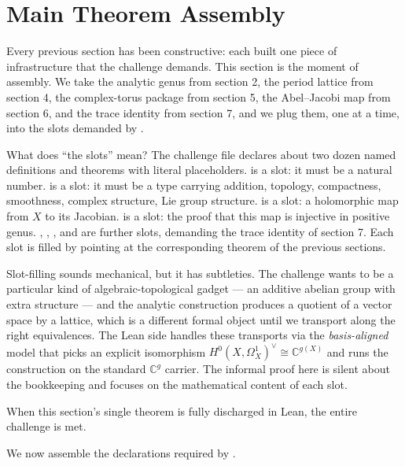 \section{Main Theorem Assembly}
\label{sec:main-assembly}

\begin{layman}
Every previous section has been constructive: each built one piece
of infrastructure that the challenge demands. This section is the
moment of assembly. We take the analytic genus from section 2, the
period lattice from section 4, the complex-torus package from
section 5, the Abel--Jacobi map from section 6, and the trace
identity from section 7, and we plug them, one at a time, into
the slots demanded by .

What does ``the slots'' mean? The challenge file declares about
two dozen named definitions and theorems with literal 
placeholders.  is a slot: it must be a natural
number.  is a slot: it must be a type carrying
addition, topology, compactness, smoothness, complex structure,
Lie group structure.  is a slot: a holomorphic
map from \(X\) to its Jacobian.  is a slot:
the proof that this map is injective in positive genus.
, , , and
 are further slots, demanding the
trace identity of section 7. Each slot is filled by pointing
at the corresponding theorem of the previous sections.

Slot-filling sounds mechanical, but it has subtleties. The
challenge wants  to be a particular kind of
algebraic-topological gadget — an additive abelian group with
extra structure — and the analytic construction produces a
quotient of a vector space by a lattice, which is a different
formal object until we transport along the right equivalences.
The Lean side handles these transports via the
\emph{basis-aligned} model that picks an explicit isomorphism
\(H^0(X,\Omega^1_X)^{\vee} \cong \mathbb{C}^{g(X)}\) and runs the
construction on the standard \(\mathbb{C}^g\) carrier. The
informal proof here is silent about the bookkeeping and focuses
on the mathematical content of each slot.

When this section's single theorem is fully discharged in Lean,
the entire challenge is met.
\end{layman}

We now assemble the declarations required by .

